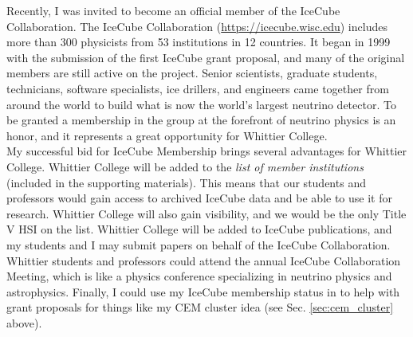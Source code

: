 \documentclass[../../../main.tex]{subfiles}
\begin{document}
Recently, I was invited to become an official member of the IceCube Collaboration.  The IceCube Collaboration (\url{https://icecube.wisc.edu}) includes more than 300 physicists from 53 institutions in 12 countries. It began in 1999 with the submission of the first IceCube grant proposal, and many of the original members are still active on the project.  Senior scientists, graduate students, technicians, software specialists, ice drillers, and engineers came together from around the world to build what is now the world’s largest neutrino detector.  To be granted a membership in the group at the forefront of neutrino physics is an honor, and it represents a great opportunity for Whittier College.
\\
\vspace{0.25cm}
My successful bid for IceCube Membership brings several advantages for Whittier College.  Whittier College will be added to the \textit{list of member institutions} (included in the supporting materials).  This means that our students and professors would gain access to archived IceCube data and be able to use it for research.  Whittier College will also gain visibility, and we would be the only Title V HSI on the list.  Whittier College will be added to IceCube publications, and my students and I may submit papers on behalf of the IceCube Collaboration.  Whittier students and professors could attend the annual IceCube Collaboration Meeting, which is like a physics conference specializing in neutrino physics and astrophysics.  Finally, I could use my IceCube membership status in to help with grant proposals for things like my CEM cluster idea (see Sec. \ref{sec:cem_cluster} above).
\end{document}
